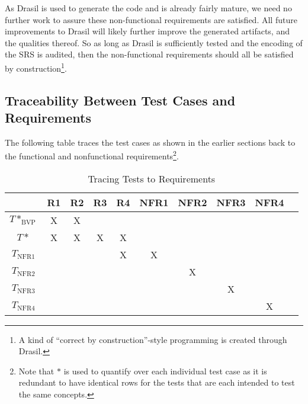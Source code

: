 \documentclass[12pt, titlepage]{article}
\begin{document}
As Drasil is used to generate the code and is already fairly mature, we need no
further work to assure these non-functional requirements are satisfied. All
future improvements to Drasil will likely further improve the generated
artifacts, and the qualities thereof. So as long as Drasil is sufficiently
tested and the encoding of the SRS is audited, then the non-functional
requirements should all be satisfied by construction\footnote{A kind of
    ``correct by construction''-style programming is created through Drasil.}.

\subsection{Traceability Between Test Cases and Requirements}

The following table traces the test cases as shown in the earlier sections back
to the functional and nonfunctional requirements\footnote{Note that $*$ is used
    to quantify over each individual test case as it is redundant to have identical
    rows for the tests that are each intended to test the same concepts.}.

\begin{longtable}{|c|c|c|c|c|c|c|c|c|c|}
    \caption{Tracing Tests to Requirements}
    \label{tab:trace_tests_to_reqs}                                 \\

    \hline

                    & R1 & R2 & R3 & R4 & NFR1 & NFR2 & NFR3 & NFR4 \\ \hline
    $T*_\text{BVP}$ & X  & X  &    &    &      &      &      &      \\ \hline
    $T*$            & X  & X  & X  & X  &      &      &      &      \\ \hline
    $T_\text{NFR1}$ &    &    &    & X  & X    &      &      &      \\ \hline
    $T_\text{NFR2}$ &    &    &    &    &      & X    &      &      \\ \hline
    $T_\text{NFR3}$ &    &    &    &    &      &      & X    &      \\ \hline
    $T_\text{NFR4}$ &    &    &    &    &      &      &      & X    \\ \hline
\end{longtable}

\newpage{}
\end{document}
